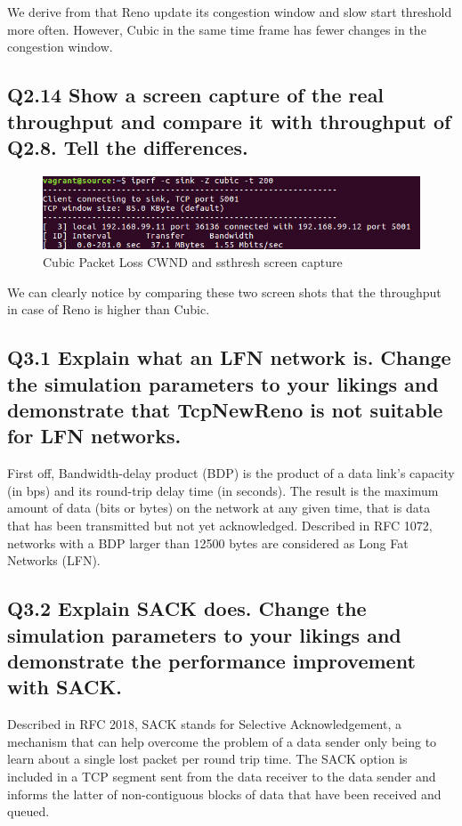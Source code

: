 \documentclass{article}
\begin{document}
We derive from that Reno update its congestion window and slow start threshold more often. However, Cubic in the same time frame has fewer changes in the congestion window. 

\subsection{Q2.14 Show a screen capture of the real throughput and
compare it with throughput of Q2.8. Tell the differences.}

\begin{figure}[H]
\centering
\includegraphics[width=12cm]{figures/cubicScreenCapture.png}
\caption{Cubic Packet Loss CWND and ssthresh screen capture}
\end{figure}

We can clearly notice by comparing these two screen shots that the throughput in case of Reno is higher than Cubic. 

\subsection{Q3.1 Explain what an LFN network is. Change the simulation parameters to your likings and demonstrate that TcpNewReno is not suitable for LFN networks.}

First off, Bandwidth-delay product (BDP) is the product of a data link’s capacity (in bps) and its round-trip delay time (in seconds). The result is the maximum amount of data (bits or bytes) on the network at any given time, that is data that has been transmitted but not yet acknowledged. Described in RFC 1072, networks with a BDP larger than 12500 bytes are considered as Long Fat Networks (LFN).

\subsection{Q3.2 Explain SACK does. Change the simulation parameters to
your likings and demonstrate the performance improvement with SACK.}

Described in RFC 2018, SACK stands for Selective Acknowledgement, a mechanism that can help overcome the problem of a data sender only being to learn about a single lost packet per round trip time. The SACK option is included in a TCP segment sent from the data receiver to the data sender and informs the latter of non-contiguous blocks of data that have been received and queued.
\end{document}
